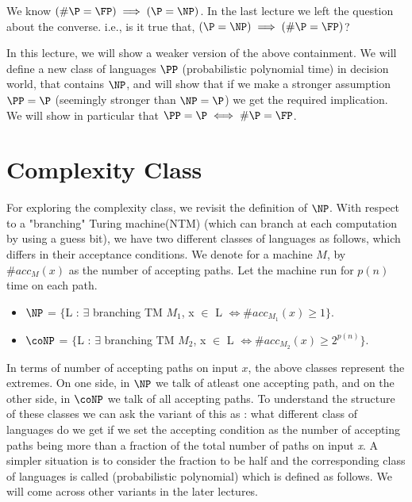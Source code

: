 
We know $(\#\P = \FP) \implies (\P = \NP)$. In the last lecture we left the question about the converse.
i.e., is it true that, $(\P = \NP) \implies (\#\P = \FP)$?

In this lecture, we will show a weaker version of the above containment.
We will define a new class of languages $\PP$ (probabilistic polynomial time)
in decision world, that contains $\NP$, and will show that if we make a stronger assumption $\PP = \P$ (seemingly stronger than $\NP = \P$) we get the required implication.  We will show in particular that $\PP = \P \iff \#\P = \FP$.

\section{Complexity Class \PP}
For exploring the complexity class, we revisit the definition of $\NP$.
With respect to a "branching" Turing machine(NTM) (which can branch at each computation by using a guess bit), we have two different classes of languages as follows, which differs in their acceptance conditions. We denote for a machine $M$, by $\#acc_M(x)$ as the number of accepting paths. Let the machine run for $p(n)$ time on each path.
\begin{itemize}
\item $\NP$ = $\{$L : $\exists$ branching TM $M_1$, x $\in$ L $\iff \#acc_{M_1}(x) \ge 1 \}$.
\item $\coNP$ = $\{$L : $\exists$ branching TM $M_2$, x $\in$ L $\iff \#acc_{M_2}(x) \ge 2^{p(n)} \}$.
\end{itemize}

In terms of number of accepting paths on input $x$, the above classes
represent the extremes.  On one side, in $\NP$ we talk of atleast one
accepting path, and on the other side, in $\coNP$ we talk of all
accepting paths. To understand the structure of these classes we can
ask the variant of this as : what different class of languages do we
get if we set the accepting condition as the number of accepting paths
being more than a fraction of the total number of paths on input {\em
  x}. A simpler situation is to consider the fraction to be half and the
corresponding class of languages is called \PP (probabilistic
polynomial) which is defined as follows. We will come across other variants in
the later lectures.

